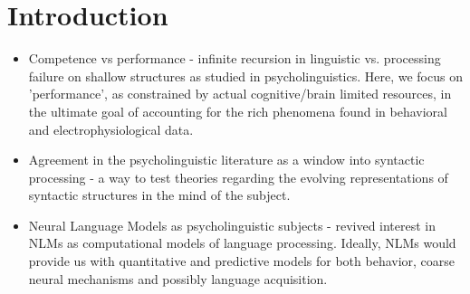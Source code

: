 \section{Introduction}

\begin{itemize}
\item Competence vs performance - infinite recursion in linguistic vs. processing failure on shallow structures as studied in psycholinguistics. Here, we focus on 'performance', as constrained by actual cognitive/brain limited resources, in the ultimate goal of accounting for the rich phenomena found in behavioral and electrophysiological data.
\item Agreement in the psycholinguistic literature as a window into syntactic processing - a way to test theories regarding the evolving representations of syntactic structures in the mind of the subject. 
\item Neural Language Models as psycholinguistic subjects - revived interest in  NLMs as computational models of language processing. Ideally, NLMs would provide us with quantitative and predictive models for both behavior, coarse neural mechanisms and possibly language acquisition. 


\end{itemize}
